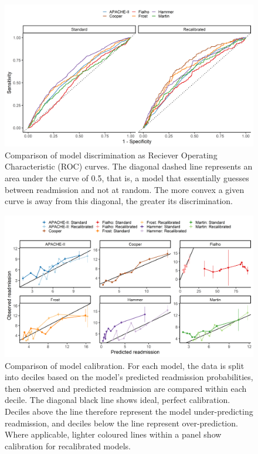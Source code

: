 \documentclass[onecolumn]{article}
\begin{document}
\begin{figure}[t]
\centering
	\includegraphics[width=\textwidth]{discrimination.png}
	\caption{Comparison of model discrimination as Reciever Operating Characteristic (ROC) curves. The diagonal dashed line represents an area under the curve of 0.5, that is, a model that essentially guesses between readmission and not at random. The more convex a given curve is away from this diagonal, the greater its discrimination.}
	\label{DiscriminationFig}
\end{figure}


\begin{figure}[t]
\centering
	\includegraphics[width=\textwidth]{calibration.png}
	\caption{Comparison of model calibration. For each model, the data is split into deciles based on the model's predicted readmission probabilities, then observed and predicted readmission are compared within each decile. The diagonal black line shows ideal, perfect calibration. Deciles above the line therefore represent the model under-predicting readmission, and deciles below the line represent over-prediction. Where applicable, lighter coloured lines within a panel show calibration for recalibrated models.}
	\label{CalibrationFig}
\end{figure}
\end{document}
